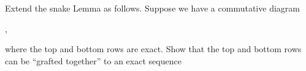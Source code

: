 \documentclass[11pt]{book} %
\begin{document}
\begin{exr}
Extend the snake Lemma as follows. Suppose we have a commutative diagram
\begin{center}
,
\end{center}
where the top and bottom rows are exact. Show that the top and bottom rows can
be “grafted together” to an exact sequence
\begin{center}
\end{center}
\end{exr}
\end{document}
